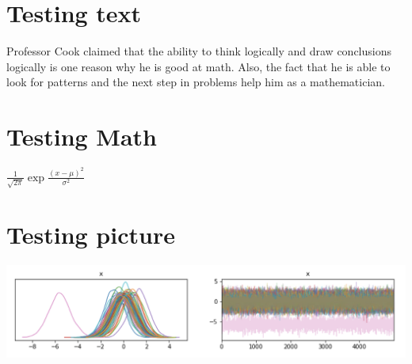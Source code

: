 \documentclass[a4paper]{article}
\author{Dylan Esguerra}
\date{September 2, 2022}
\begin{document}
\maketitle



\section{Testing text}

Professor Cook claimed that the ability to think logically and draw conclusions logically is one reason why he is good at math. Also, the fact that he is able to look for patterns and the next step in problems help him as a mathematician.

\section{Testing Math}
\label{sec:examples}


$\frac{1}{\sqrt{2\pi}}\exp{\frac{(x-\mu)^2}{\sigma^2}}$

\section{Testing picture}

\includegraphics[scale=0.5]{trace_test.png}
\end{document}
